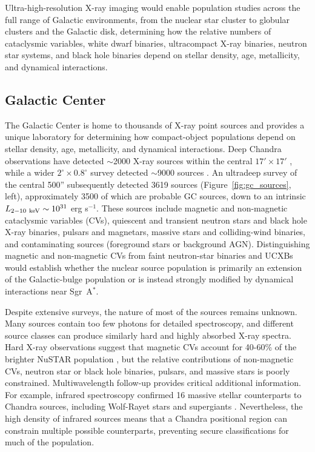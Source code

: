 \documentclass{article}
\begin{document}
Ultra-high-resolution X-ray imaging would enable population studies across the full range of Galactic environments, from the nuclear star cluster to globular clusters and the Galactic disk, determining how the relative numbers of cataclysmic variables, white dwarf binaries, ultracompact X-ray binaries, neutron star systems, and black hole binaries depend on stellar density, age, metallicity, and dynamical interactions.

    
\subsection{Galactic Center}
\label{sec:galactic_center}
The Galactic Center is home to thousands of X-ray point sources \cite{2009ApJS..181..110M,2003ApJ...589..225M} and provides a unique laboratory for determining how compact-object populations depend on stellar density, age, metallicity, and dynamical interactions. Deep Chandra observations have detected $\sim$2000 X-ray sources within the central $17' \times 17'$ \cite{2003ApJ...589..225M}, while a wider $2^\circ \times 0.8^\circ $ survey detected $\sim$9000 sources \cite{2009ApJS..181..110M}. An ultradeep survey of the central 500'' subsequently detected 3619 sources (Figure~\ref{fig:gc_sources}, left), approximately 3500 of which are probable GC sources, down to an intrinsic $L_{\rm 2-10\ keV} \sim 10^{31}$ erg s$^{-1}$\cite{Zhu2018}. These sources include magnetic and non-magnetic cataclysmic variables (CVs), quiescent and transient neutron stars and black hole X-ray binaries, pulsars and magnetars, massive stars and colliding-wind binaries, and contaminating sources (foreground stars or background AGN). Distinguishing magnetic and non-magnetic CVs from faint neutron-star binaries and UCXBs would establish whether the nuclear source population is primarily an extension of the Galactic-bulge population or is instead strongly modified by dynamical interactions near Sgr~A$^*$.

Despite extensive surveys, the nature of most of the sources remains unknown. Many sources contain too few photons for detailed spectroscopy, and different source classes can produce similarly hard and highly absorbed X-ray spectra. Hard X-ray observations suggest that magnetic CVs account for 40-60\% of the brighter NuSTAR population \cite{Hong2016}, but the relative contributions of non-magnetic CVs, neutron star or black hole binaries, pulsars, and massive stars is poorly constrained. Multiwavelength follow-up provides critical additional information. For example, infrared spectroscopy confirmed 16 massive stellar counterparts to Chandra sources, including Wolf-Rayet stars and supergiants \cite{Mauerhan2010}. Nevertheless, the high density of infrared sources means that a Chandra positional region can constrain multiple possible counterparts, preventing secure classifications for much of the population.
\end{document}
